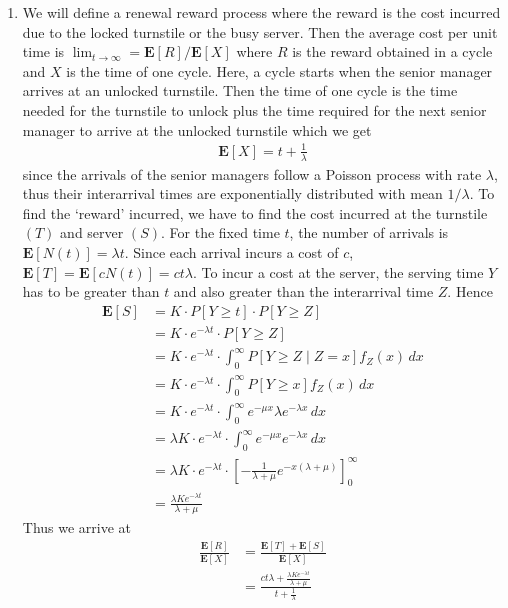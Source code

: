 \documentclass[a4paper,10pt]{article}
\theoremstyle{definition}
\begin{document}
\begin{enumerate}
\item We will define a renewal reward process where the reward is the cost incurred due to the locked turnstile or the busy server. Then the average cost per unit time is $\lim_{t \to \infty}=\mathbf{E}[R]/\mathbf{E}[X]$ where $R$ is the reward obtained in  a cycle and $X$ is the time of one cycle. Here, a cycle starts when the senior manager arrives at an unlocked turnstile. Then the time of one cycle is the time needed for the turnstile to unlock plus the time required for the next senior manager to arrive at the unlocked turnstile which we get
\begin{align*}
\mathbf{E}[X]=t+\frac{1}{\lambda}
\end{align*}
since the arrivals of the senior managers follow a Poisson process with rate $\lambda$, thus their interarrival times are exponentially distributed with mean $1/\lambda$. To find the `reward' incurred, we have to find the cost incurred at the turnstile $(T)$ and server $(S)$. For the fixed time $t$, the number of arrivals is $\mathbf{E}[N(t)]=\lambda t$. Since each arrival incurs a cost of $c$, $\mathbf{E}[T]=\mathbf{E}[cN(t)]=ct\lambda$. To incur a cost at the server, the serving time $Y$ has to be greater than $t$ and also greater than the interarrival time $Z$. Hence
\begin{align*}
\mathbf{E}[S]&=K\cdot P\left[Y\geq t\right]\cdot P\left[Y\geq Z\right]\\
&=K\cdot e^{-\lambda t}\cdot P\left[Y\geq Z\right]\\
&=K\cdot e^{-\lambda t}\cdot \int_{0}^{\infty}P\left[Y\geq Z\mid Z=x\right]f_Z(x)\,dx\\
&=K\cdot e^{-\lambda t}\cdot \int_{0}^{\infty}P\left[Y\geq x\right]f_Z(x)\,dx\\
&=K\cdot e^{-\lambda t}\cdot \int_{0}^{\infty}e^{-\mu x}\lambda e^{-\lambda x}\,dx\\
&=\lambda K\cdot e^{-\lambda t}\cdot \int_{0}^{\infty}e^{-\mu x} e^{-\lambda x}\,dx\\
&=\lambda K\cdot e^{-\lambda t}\cdot \left[-\frac{1}{\lambda+\mu}e^{-x(\lambda+\mu)}\right]_{0}^{\infty}\\
&=\frac{\lambda Ke^{-\lambda t}}{\lambda+\mu}
\end{align*}
Thus we arrive at 
\begin{align*}
\frac{\mathbf{E}[R]}{\mathbf{E}[X]}&=\frac{\mathbf{E}[T]+\mathbf{E}[S]}{\mathbf{E}[X]}\\
&=\frac{ct\lambda+\frac{\lambda Ke^{-\lambda t}}{\lambda+\mu}}{t+\frac{1}{\lambda}}

\end{align*}
\end{enumerate}
\end{document}
